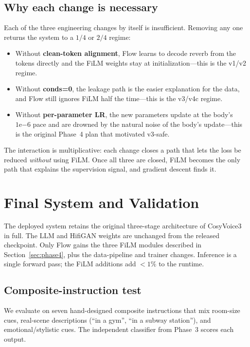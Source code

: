 \documentclass{article}
\begin{document}
\subsection{Why each change is necessary}

Each of the three engineering changes by itself is insufficient. Removing any
one returns the system to a $1/4$ or $2/4$ regime:

\begin{itemize}
\item Without \textbf{clean-token alignment}, Flow learns to decode reverb
from the tokens directly and the FiLM weights stay at initialization---this
is the v1/v2 regime.
\item Without \textbf{conds=0}, the leakage path is the easier explanation
for the data, and Flow still ignores FiLM half the time---this is the v3/v4c
regime.
\item Without \textbf{per-parameter LR}, the new parameters update at the
body's $1\mathrm{e}{-6}$ pace and are drowned by the natural noise of the
body's update---this is the original Phase~4 plan that motivated v3-safe.
\end{itemize}

The interaction is multiplicative: each change closes a path that lets the
loss be reduced \emph{without} using FiLM. Once all three are closed, FiLM
becomes the only path that explains the supervision signal, and gradient
descent finds it.

\section{Final System and Validation}

The deployed system retains the original three-stage architecture of
CosyVoice3 in full. The LLM and HifiGAN weights are unchanged from the
released checkpoint. Only Flow gains the three FiLM modules described in
Section~\ref{sec:phase4}, plus the data-pipeline and trainer changes.
Inference is a single forward pass; the FiLM additions add $<1\%$ to the
runtime.

\subsection{Composite-instruction test}

We evaluate on seven hand-designed composite instructions that mix room-size
cues, real-scene descriptions (``in a gym'', ``in a subway station''), and
emotional/stylistic cues. The independent classifier from Phase~3 scores each
output.
\end{document}
